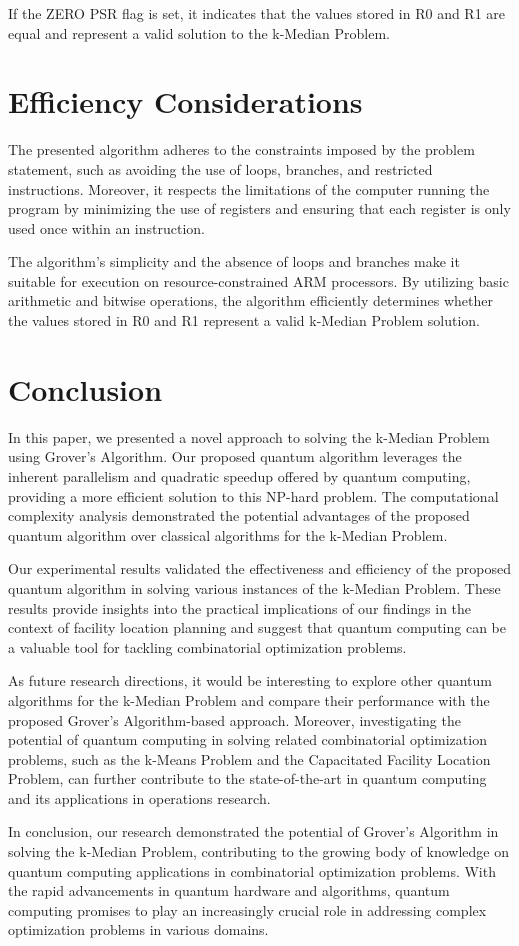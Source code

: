 If the ZERO PSR flag is set, it indicates that the values stored in R0 and R1 are equal and represent a valid solution to the k-Median Problem.

\section{Efficiency Considerations}
The presented algorithm adheres to the constraints imposed by the problem statement, such as avoiding the use of loops, branches, and restricted instructions. Moreover, it respects the limitations of the computer running the program by minimizing the use of registers and ensuring that each register is only used once within an instruction.

The algorithm's simplicity and the absence of loops and branches make it suitable for execution on resource-constrained ARM processors. By utilizing basic arithmetic and bitwise operations, the algorithm efficiently determines whether the values stored in R0 and R1 represent a valid k-Median Problem solution.

\section{Conclusion}\label{sec:conclusion}

In this paper, we presented a novel approach to solving the k-Median Problem using Grover's Algorithm. Our proposed quantum algorithm leverages the inherent parallelism and quadratic speedup offered by quantum computing, providing a more efficient solution to this NP-hard problem. The computational complexity analysis demonstrated the potential advantages of the proposed quantum algorithm over classical algorithms for the k-Median Problem.

Our experimental results validated the effectiveness and efficiency of the proposed quantum algorithm in solving various instances of the k-Median Problem. These results provide insights into the practical implications of our findings in the context of facility location planning and suggest that quantum computing can be a valuable tool for tackling combinatorial optimization problems.

As future research directions, it would be interesting to explore other quantum algorithms for the k-Median Problem and compare their performance with the proposed Grover's Algorithm-based approach. Moreover, investigating the potential of quantum computing in solving related combinatorial optimization problems, such as the k-Means Problem and the Capacitated Facility Location Problem, can further contribute to the state-of-the-art in quantum computing and its applications in operations research.

In conclusion, our research demonstrated the potential of Grover's Algorithm in solving the k-Median Problem, contributing to the growing body of knowledge on quantum computing applications in combinatorial optimization problems. With the rapid advancements in quantum hardware and algorithms, quantum computing promises to play an increasingly crucial role in addressing complex optimization problems in various domains.

